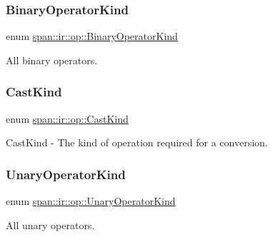 \subsubsection{\texorpdfstring{Binary\+Operator\+Kind}{BinaryOperatorKind}}
{\footnotesize\ttfamily enum \hyperlink{namespacespan_1_1ir_1_1op_a5741ac4595bea9e1d2821a8bb5d953e3}{span\+::ir\+::op\+::\+Binary\+Operator\+Kind}}



All binary operators. 

\mbox{\label{namespacespan_1_1ir_1_1op_a04abe430db9937e27dc5df909415002b}} 
\subsubsection{\texorpdfstring{Cast\+Kind}{CastKind}}
{\footnotesize\ttfamily enum \hyperlink{namespacespan_1_1ir_1_1op_a04abe430db9937e27dc5df909415002b}{span\+::ir\+::op\+::\+Cast\+Kind}}



Cast\+Kind -\/ The kind of operation required for a conversion. 

\mbox{\label{namespacespan_1_1ir_1_1op_ab88ceb1213c3473d4f5fc848509dd181}} 
\subsubsection{\texorpdfstring{Unary\+Operator\+Kind}{UnaryOperatorKind}}
{\footnotesize\ttfamily enum \hyperlink{namespacespan_1_1ir_1_1op_ab88ceb1213c3473d4f5fc848509dd181}{span\+::ir\+::op\+::\+Unary\+Operator\+Kind}}



All unary operators. 

